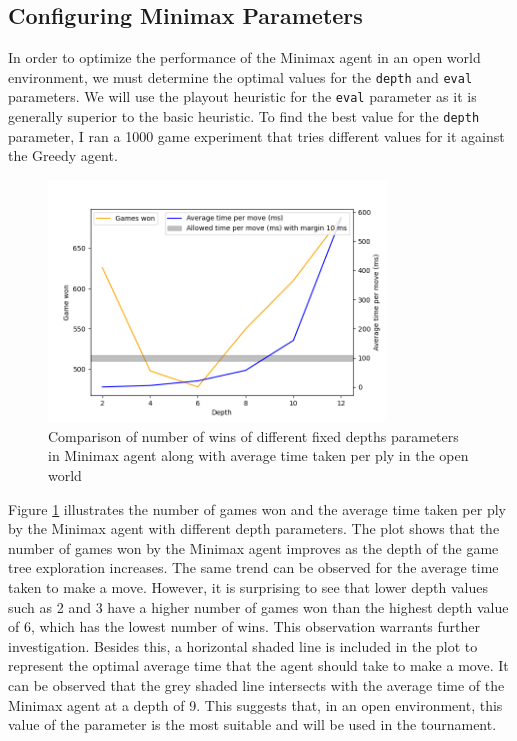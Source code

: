 \subsection{Configuring Minimax Parameters}

In order to optimize the performance of the Minimax agent in an open world environment, we must determine the optimal values for the \texttt{depth} and \texttt{eval} parameters. We will use the playout heuristic for the \texttt{eval} parameter as it is generally superior to the basic heuristic. To find the best value for the \texttt{depth} parameter, I ran a 1000 game experiment that tries different values for it against the Greedy agent. 

\begin{figure}[h]
  \centering
  \captionsetup{justification=centering}
  \includegraphics[width=0.8\textwidth]{../img/minimax_config_openworld.png}
  \caption{Comparison of number of wins of different fixed depths parameters in Minimax agent along with average time taken per ply in the open world}
  \label{minimaxOWDepth}
\end{figure}

Figure \ref{minimaxOWDepth} illustrates the number of games won and the average time taken per ply by the Minimax agent with different depth parameters. The plot shows that the number of games won by the Minimax agent improves as the depth of the game tree exploration increases. The same trend can be observed for the average time taken to make a move. However, it is surprising to see that lower depth values such as 2 and 3 have a higher number of games won than the highest depth value of 6, which has the lowest number of wins. This observation warrants further investigation. Besides this, a horizontal shaded line is included in the plot to represent the optimal average time that the agent should take to make a move. It can be observed that the grey shaded line intersects with the average time of the Minimax agent at a depth of 9. This suggests that, in an open environment, this value of the parameter is the most suitable and will be used in the tournament.

